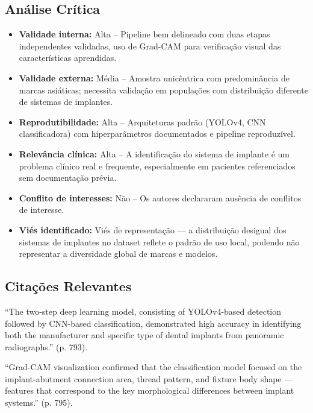 \subsection{Análise Crítica}
\begin{itemize}
  \item \textbf{Validade interna:} Alta -- Pipeline bem delineado com duas
        etapas independentes validadas, uso de Grad-CAM para verificação
        visual das características aprendidas.
  \item \textbf{Validade externa:} Média -- Amostra unicêntrica com
        predominância de marcas asiáticas; necessita validação em
        populações com distribuição diferente de sistemas de implantes.
  \item \textbf{Reprodutibilidade:} Alta -- Arquiteturas padrão (YOLOv4,
        CNN classificadora) com hiperparâmetros documentados e pipeline
        reproduzível.
  \item \textbf{Relevância clínica:} Alta -- A identificação do sistema
        de implante é um problema clínico real e frequente, especialmente
        em pacientes referenciados sem documentação prévia.
  \item \textbf{Conflito de interesses:} Não -- Os autores declararam
        ausência de conflitos de interesse.
  \item \textbf{Viés identificado:} Viés de representação — a distribuição
        desigual dos sistemas de implantes no dataset reflete o padrão
        de uso local, podendo não representar a diversidade global de
        marcas e modelos.
\end{itemize}

\subsection{Citações Relevantes}
\begin{citacao}
``The two-step deep learning model, consisting of YOLOv4-based detection
followed by CNN-based classification, demonstrated high accuracy in
identifying both the manufacturer and specific type of dental implants
from panoramic radiographs.'' (p. 793).
\end{citacao}

\begin{citacao}
``Grad-CAM visualization confirmed that the classification model focused
on the implant-abutment connection area, thread pattern, and fixture
body shape — features that correspond to the key morphological
differences between implant systems.'' (p. 795).
\end{citacao}

